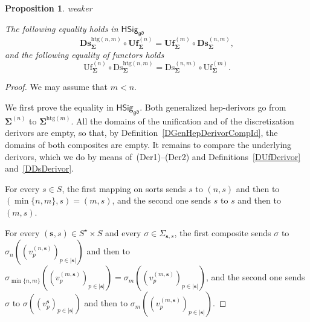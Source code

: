 \documentclass[a4paper, reqno]{amsbook}
\makeatletter
\newcommand{\bb}[1]{\ensuremath{\lvert #1 \rvert}}
\newcommand{\sig}[1]{\mathbf{#1}}             %
\newcommand{\gd}{\mathfrak{gd}}              %
\newcommand{\htg}{\mathrm{htg}}                %
\newcommand{\Uf}{\mathrm{Uf}}
\newcommand{\Ds}{\mathrm{Ds}}
\newcommand{\bUf}{\mathbf{Uf}}
\newcommand{\bDs}{\mathbf{Ds}}
\theoremstyle{plain}
\newtheorem{proposition}[theorem]{Proposition}
\theoremstyle{definition}
\newcommand*{\CA@leanpending}{}
\newcommand*{\CA@leanrelation}{}
\newcommand*{\lean}[2]{%
  \ifcsname\string\color@lean@#1\endcsname\else
    \PackageError{main}{Unknown relation `#1' in \string\lean}{Use equivalent, weaker or stronger.}%
  \fi
  \gdef\CA@leanrelation{#1}%
  \gdef\CA@leanpending{#2}}
\makeatother
\begin{document}
\begin{proposition}\label{PCompatUfDs}\lean{weaker}{Dimensions.discretization_unification,Dimensions.discretizationUnificationFunctor}
The following equality holds in $\mathsf{HSig}_{\gd}$
$$
\bDs^{\htg(n,m)}_{\sig{\Sigma}}\circ\bUf^{(n)}_{\sig{\Sigma}}=\bUf^{(m)}_{\sig{\Sigma}}\circ\bDs^{(n,m)}_{\sig{\Sigma}},
$$
and the following equality of functors holds
$$
\Uf^{(n)}_{\sig{\Sigma}}\circ\Ds^{\htg(n,m)}_{\sig{\Sigma}}=\Ds^{(n,m)}_{\sig{\Sigma}}\circ\Uf^{(m)}_{\sig{\Sigma}}.
$$
\end{proposition}
\begin{proof}
We may assume that $m<n$.

We first prove the equality in $\mathsf{HSig}_{\gd}$.
Both generalized hep-derivors go from $\sig{\Sigma}^{(n)}$ to $\sig{\Sigma}^{\htg(m)}$.
All the domains of the unification and of the discretization derivors are empty, so that, by Definition~\ref{DGenHepDerivorCompId}, the domains of both composites are empty.
It remains to compare the underlying derivors, which we do by means of~(Der1)--(Der2) and Definitions~\ref{DUfDerivor} and~\ref{DDsDerivor}.

For every $s\in S$, the first mapping on sorts sends $s$ to $(n,s)$ and then to $(\min\{n,m\},s)=(m,s)$, and the second one sends $s$ to $s$ and then to $(m,s)$.

For every $(\mathbf{s},s)\in S^{\star}\times S$ and every $\sigma\in\Sigma_{\mathbf{s},s}$, the first composite sends $\sigma$ to $\sigma_{n}((v^{(n,\mathbf{s})}_{p})_{p\in\bb{\mathbf{s}}})$ and then to $\sigma_{\min\{n,m\}}((v^{(m,\mathbf{s})}_{p})_{p\in\bb{\mathbf{s}}})=\sigma_{m}((v^{(m,\mathbf{s})}_{p})_{p\in\bb{\mathbf{s}}})$, and the second one sends $\sigma$ to $\sigma((v^{\mathbf{s}}_{p})_{p\in\bb{\mathbf{s}}})$ and then to $\sigma_{m}((v^{(m,\mathbf{s})}_{p})_{p\in\bb{\mathbf{s}}})$.


\end{proof}
\end{document}
